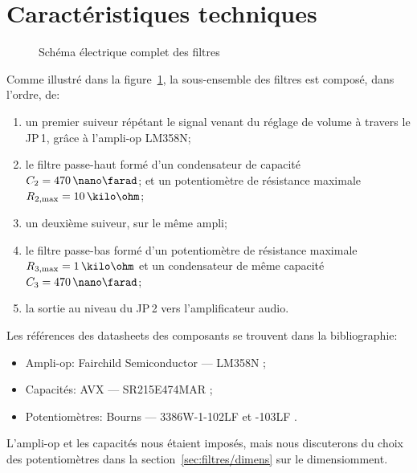 \section{Caractéristiques techniques}
\label{sec:filtres/car-tech}

\begin{figure}[h!]
 \centering
  \caption{Schéma électrique complet des filtres}
  \label{fig:schema-elec-filtres}
\end{figure}

Comme illustré dans la figure~\ref{fig:schema-elec-filtres},
la sous-ensemble des filtres est composé, dans l'ordre, de:
\begin{enumerate}
    \item un premier suiveur répétant le signal venant du réglage de volume
        à travers le JP\,1, grâce à l'ampli-op LM358N;
    \item le filtre passe-haut formé d'un
        condensateur de capacité $C_2 = 470\,\nano\farad$;
        et un potentiomètre de résistance
        maximale $R\ind{2,max} = 10\,\kilo\ohm$;
    \item un deuxième suiveur, sur le même ampli;
    \item le filtre passe-bas formé d'un potentiomètre de résistance
        maximale $R\ind{3,max} = 1\,\kilo\ohm$
        et un condensateur de même capacité $C_3 = 470\,\nano\farad$;
    \item la sortie au niveau du JP\,2 vers l'amplificateur audio.
\end{enumerate}

Les références des datasheets des composants se trouvent dans la bibliographie:
\begin{itemize}
    \item Ampli-op: Fairchild Semiconductor --- LM358N \cite{datasheet-lm358n};
    \item Capacités: AVX --- SR215E474MAR \cite{datasheet-470nf};
    \item Potentiomètres: Bourns --- 3386W-1-102LF et -103LF \cite{datasheet-pot}.
\end{itemize}

L'ampli-op et les capacités nous étaient imposés,
mais nous discuterons du choix des potentiomètres dans
la section~\ref{sec:filtres/dimens} sur le dimensiomment.
